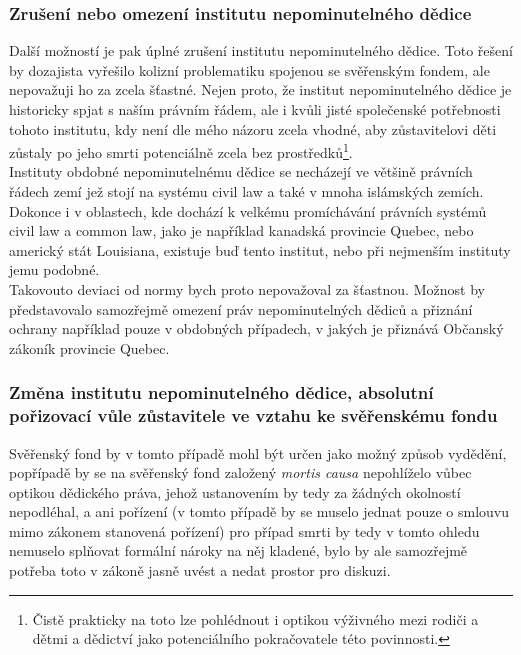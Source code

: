 \documentclass{article}
\begin{document}
\subsubsection{Zrušení nebo omezení institutu nepominutelného dědice}

Další možností je pak úplné zrušení institutu nepominutelného dědice. Toto řešení by dozajista vyřešilo kolizní problematiku spojenou se svěřenským fondem, ale nepovažuji ho za zcela šťastné. Nejen proto, že institut nepominutelného dědice je historicky spjat s naším právním řádem, ale i kvůli jisté společenské potřebnosti tohoto institutu, kdy není dle mého názoru zcela vhodné, aby zůstavitelovi děti zůstaly po jeho smrti potenciálně zcela bez prostředků\footnote{Čistě prakticky na toto lze pohlédnout i optikou výživného mezi rodiči a dětmi a dědictví jako potenciálního pokračovatele této povinnosti.}.\\

Instituty obdobné nepominutelnému dědice se necházejí ve většině právních řádech zemí jež stojí na systému civil law a také v mnoha islámských zemích. Dokonce i v oblastech, kde dochází k velkému promíchávání právních systémů civil law a common law, jako je například kanadská provincie Quebec, nebo americký stát Louisiana, existuje buď tento institut, nebo při nejmenším instituty jemu podobné.\\

Takovouto deviaci od normy bych proto nepovažoval za šťastnou. Možnost by představovalo samozřejmě omezení práv nepominutelných dědiců a přiznání ochrany například pouze v obdobných případech, v jakých je přiznává Občanský zákoník provincie Quebec.


\subsubsection{Změna institutu nepominutelného dědice, absolutní pořizovací vůle zůstavitele ve vztahu ke svěřenskému fondu}

Svěřenský fond by v tomto případě mohl být určen jako možný způsob vydědění, popřípadě by se na svěřenský fond založený \textit{mortis causa} nepohlíželo vůbec optikou dědického práva, jehož ustanovením by tedy za žádných okolností nepodléhal, a ani pořízení (v tomto případě by se muselo jednat pouze o smlouvu mimo zákonem stanovená pořízení) pro případ smrti by tedy v tomto ohledu nemuselo splňovat formální nároky na něj kladené, bylo by ale samozřejmě potřeba toto v zákoně jasně uvést a nedat prostor pro diskuzi.\\
\end{document}
